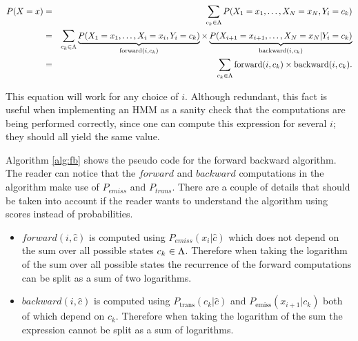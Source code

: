 \begin{eqnarray}
\label{eq::fbsanity}
  P(X=x) &=& 
  \sum_{c_k \in \Lambda} P(X_1=x_1,\ldots, X_N=x_N,Y_i=c_k)\nonumber\\
  & =&
  \sum_{c_k \in \Lambda} 
  \underbrace{P(X_1=x_1,\ldots, X_i=x_i, Y_i=c_k)}_{\mathrm{forward}(i,c_k)} \times 
  \underbrace{P(X_{i+1}=x_{i+1},\ldots, X_N=x_N| Y_i=c_k)}_{\mathrm{backward}(i,c_k)}\nonumber\\
  &=& \sum_{c_k \in \Lambda} \mathrm{forward}(i,c_k) \times \mathrm{backward}(i,c_k).
\end{eqnarray}


This equation will work for any choice of $i$. Although redundant, this fact is useful when implementing an
HMM as a sanity check that the computations are being performed
correctly, since one can compute this expression for several $i$; they should all yield the same value. 

Algorithm \ref{alg:fb} shows the pseudo code for the forward backward algorithm. The reader can notice that the $forward$ and $backward$ computations in the algorithm make use of $P_{emiss}$ and $P_{trans}$. There are a couple of details that should be taken into account if the reader wants to understand the algorithm using scores instead of probabilities.

\begin{itemize}
\item  $forward(i,\hat{c})$  is computed using $P_{emiss}(x_i | \hat{c})$ which does not depend on the sum over all possible states $c_k \in  \Lambda $. Therefore when taking the logarithm of the sum over all possible states the recurrence of the forward computations can be split as a sum of two logarithms.
\item $backward(i,\hat{c})$  is computed using $ P_{\mathrm{trans}}(c_k | \hat{c} )$ and $P_{\mathrm{emiss}}(x_{i+1} | c_k) $ both of  which  depend on $c_k$. Therefore when taking the logarithm of the sum the expression cannot be split as a sum of logarithms.
\end{itemize}


